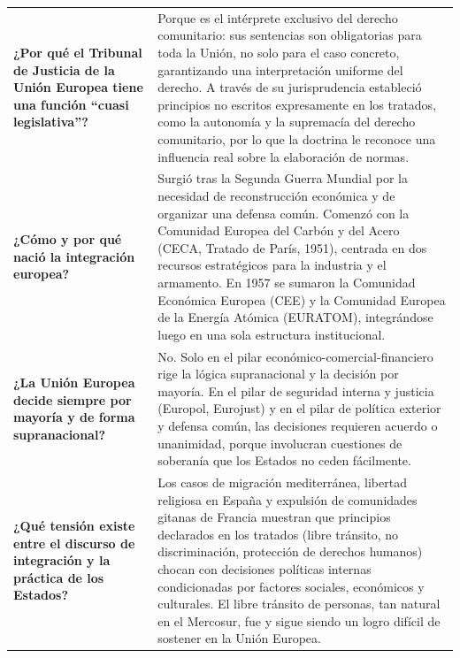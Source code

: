 \documentclass[12pt,oneside]{book}
\begin{document}
\begin{longtable}{
    >{\raggedright\arraybackslash}p{}
    >{\raggedright\arraybackslash}p{}
}
\textbf{¿Por qué el Tribunal de Justicia de la Unión Europea tiene una función ``cuasi legislativa''?} &
Porque es el intérprete exclusivo del derecho comunitario: sus sentencias son obligatorias para toda la Unión, no solo para el caso concreto, garantizando una interpretación uniforme del derecho. A través de su jurisprudencia estableció principios no escritos expresamente en los tratados, como la autonomía y la supremacía del derecho comunitario, por lo que la doctrina le reconoce una influencia real sobre la elaboración de normas. \\

\textbf{¿Cómo y por qué nació la integración europea?} &
Surgió tras la Segunda Guerra Mundial por la necesidad de reconstrucción económica y de organizar una defensa común. Comenzó con la Comunidad Europea del Carbón y del Acero (CECA, Tratado de París, 1951), centrada en dos recursos estratégicos para la industria y el armamento. En 1957 se sumaron la Comunidad Económica Europea (CEE) y la Comunidad Europea de la Energía Atómica (EURATOM), integrándose luego en una sola estructura institucional. \\

\textbf{¿La Unión Europea decide siempre por mayoría y de forma supranacional?} &
No. Solo en el pilar económico-comercial-financiero rige la lógica supranacional y la decisión por mayoría. En el pilar de seguridad interna y justicia (Europol, Eurojust) y en el pilar de política exterior y defensa común, las decisiones requieren acuerdo o unanimidad, porque involucran cuestiones de soberanía que los Estados no ceden fácilmente. \\

\textbf{¿Qué tensión existe entre el discurso de integración y la práctica de los Estados?} &
Los casos de migración mediterránea, libertad religiosa en España y expulsión de comunidades gitanas de Francia muestran que principios declarados en los tratados (libre tránsito, no discriminación, protección de derechos humanos) chocan con decisiones políticas internas condicionadas por factores sociales, económicos y culturales. El libre tránsito de personas, tan natural en el Mercosur, fue y sigue siendo un logro difícil de sostener en la Unión Europea. \\


\end{longtable}
\end{document}
